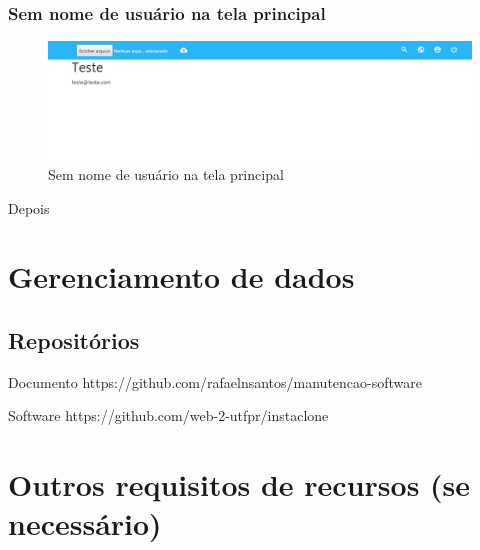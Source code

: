 \pagebreak

\subsubsection{Sem nome de usuário na tela principal}
\begin{figure}[ht]
	\centering
	\includegraphics[width=\textwidth]{./imagens/perfil_desarrumado.png}
	\caption{Sem nome de usuário na tela principal}
	\label{fig:casoDeUso}
\end{figure}

\pagebreak

Depois


\section{Gerenciamento de dados}

\subsection{Repositórios}
Documento
https://github.com/rafaelnsantos/manutencao-software

Software
https://github.com/web-2-utfpr/instaclone

\section{Outros requisitos de recursos (se necessário)}
